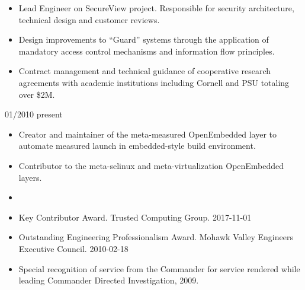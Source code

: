 \documentclass[letterpaper,11pt]{article}
\begin{document}
\begin {itemize}
  \setlength {\itemsep}{1pt}
  \setlength {\parskip}{0pt}
  \setlength {\parsep}{0pt}
  \item Lead Engineer on SecureView project. Responsible for security
    architecture, technical design and customer reviews.
  \item Design improvements to ``Guard'' systems through the application
    of mandatory access control mechanisms and information flow principles.
  \item Contract management and technical guidance of cooperative research
    agreements with academic institutions including Cornell and PSU
    totaling over \$2M.
\end {itemize}

 {01/2010} {present}
\begin {itemize}
  \setlength {\itemsep}{1pt}
  \setlength {\parskip}{0pt}
  \setlength {\parsep}{0pt}
  \item Creator and maintainer of the meta-measured OpenEmbedded layer to
    automate measured launch in embedded-style build environment.
  \item Contributor to the meta-selinux and meta-virtualization
    OpenEmbedded layers.
\end {itemize}

\begin{itemize}
  \item[]
\end{itemize}

\begin {itemize}
  \setlength {\itemsep}{1pt}
  \setlength {\parskip}{0pt}
  \setlength {\parsep}{0pt}
  \item Key Contributor Award.
    Trusted Computing Group.
    2017-11-01
  \item Outstanding Engineering Professionalism Award.
    Mohawk Valley Engineers Executive Council.
    2010-02-18
  \item Special recognition of service from the Commander for service
    rendered while leading Commander Directed Investigation, 2009.
\end {itemize}
\end{document}
